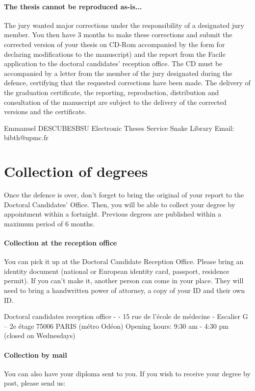 \paragraph{The thesis cannot be reproduced as-is...}
The jury wanted major corrections under the responsibility of a designated jury member. You then have 3 months to make these corrections and submit the corrected version of your thesis on CD-Rom accompanied by the form for declaring modifications to the manuscript) and the report from the Facile application to the doctoral candidates' reception office. The CD must be accompanied by a letter from the member of the jury designated during the defence, certifying that the requested corrections have been made.
The delivery of the graduation certificate, the reporting, reproduction, distribution and consultation of the manuscript are subject to the delivery of the corrected versions and the certificate.
  
Emmanuel DESCUBESBSU
Electronic Theses Service
Snake Library
Email: bibth@upmc.fr

\section{Collection of degrees}
\label{sec:collection-of-degrees}

Once the defence is over, don't forget to bring the original of your report to the Doctoral Candidates' Office.
Then, you will be able to collect your degree by appointment within a fortnight.
Previous degrees are published within a maximum period of 6 months.
    
\paragraph{Collection at the reception office}
You can pick it up at the Doctoral Candidate Reception Office. Please bring an identity document (national or European identity card, passport, residence permit). 
If you can't make it, another person can come in your place. They will need to bring a handwritten power of attorney, a copy of your ID and their own ID.

Doctoral candidates reception office - - 15 rue de l’école de médecine - Escalier G – 2e étage 75006 PARIS (métro Odéon)
Opening hours: 9:30 am - 4:30 pm (closed on Wednesdays)

\paragraph{Collection by mail}
You can also have your diploma sent to you. If you wish to receive your degree by post, please send us:

